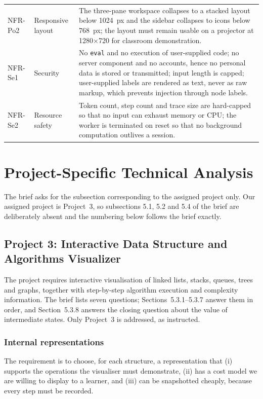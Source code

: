 \documentclass[11pt,a4paper]{article}
\newcommand{\ct}[1]{\texttt{#1}}
\begin{document}
{\begin{longtable}{@{}L{1.3cm}L{2.5cm}L{11.2cm}@{}}
NFR-Po2 & Responsive layout & The three-pane workspace collapses to a stacked layout below
1024~px and the sidebar collapses to icons below 768~px; the layout must remain usable on a
projector at 1280$\times$720 for classroom demonstration. \\
NFR-Se1 & Security & No \ct{eval} and no execution of user-supplied code; no server
component and no accounts, hence no personal data is stored or transmitted; input length is
capped; user-supplied labels are rendered as text, never as raw markup, which prevents
injection through node labels. \\
NFR-Se2 & Resource safety & Token count, step count and trace size are hard-capped so that
no input can exhaust memory or CPU; the worker is terminated on reset so that no background
computation outlives a session. \\
\end{longtable}
}

\section{Project-Specific Technical Analysis}

\noindent The brief asks for the subsection corresponding to the assigned project only. Our
assigned project is Project~3, so subsections 5.1, 5.2 and 5.4 of the brief are deliberately
absent and the numbering below follows the brief exactly.

\setcounter{subsection}{2}   %
\subsection{Project 3: Interactive Data Structure and Algorithms Visualizer}

The project requires interactive visualisation of linked lists, stacks, queues, trees and
graphs, together with step-by-step algorithm execution and complexity information. The
brief lists seven questions; Sections~5.3.1--5.3.7 answer them in order, and Section~5.3.8
answers the closing question about the value of intermediate states. Only Project~3 is
addressed, as instructed.

\subsubsection{Internal representations}

The requirement is to choose, for each structure, a representation that (i) supports the
operations the visualiser must demonstrate, (ii) has a cost model we are willing to display
to a learner, and (iii) can be snapshotted cheaply, because every step must be recorded.
\end{document}
